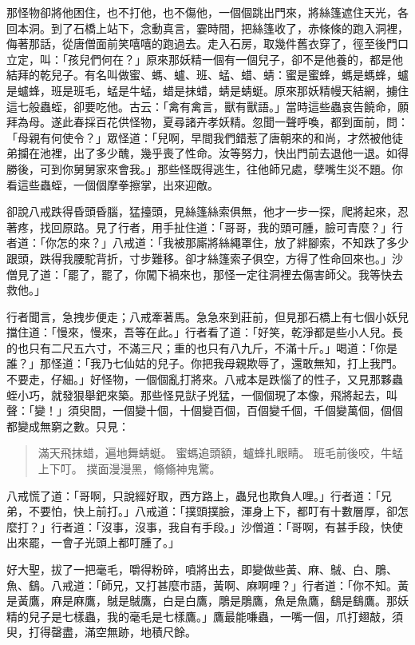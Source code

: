 那怪物卻將他困住，也不打他，也不傷他，一個個跳出門來，將絲篷遮住天光，各回本洞。到了石橋上站下，念動真言，霎時間，把絲篷收了，赤條條的跑入洞裡，侮著那話，從唐僧面前笑嘻嘻的跑過去。走入石房，取幾件舊衣穿了，徑至後門口立定，叫：「孩兒們何在？」原來那妖精一個有一個兒子，卻不是他養的，都是他結拜的乾兒子。有名叫做蜜、螞、蠦、班、蜢、蜡、蜻：蜜是蜜蜂，螞是螞蜂，蠦是蠦蜂，班是班毛，蜢是牛蜢，蜡是抹蜡，蜻是蜻蜓。原來那妖精幔天結網，擄住這七般蟲蛭，卻要吃他。古云：「禽有禽言，獸有獸語。」當時這些蟲哀告饒命，願拜為母。遂此春採百花供怪物，夏尋諸卉孝妖精。忽聞一聲呼喚，都到面前，問：「母親有何使令？」眾怪道：「兒啊，早間我們錯惹了唐朝來的和尚，才然被他徒弟攔在池裡，出了多少醜，幾乎喪了性命。汝等努力，快出門前去退他一退。如得勝後，可到你舅舅家來會我。」那些怪既得逃生，往他師兄處，孽嘴生災不題。你看這些蟲蛭，一個個摩拳擦掌，出來迎敵。

卻說八戒跌得昏頭昏腦，猛擡頭，見絲篷絲索俱無，他才一步一探，爬將起來，忍著疼，找回原路。見了行者，用手扯住道：「哥哥，我的頭可腫，臉可青麼？」行者道：「你怎的來？」八戒道：「我被那廝將絲繩罩住，放了絆腳索，不知跌了多少跟頭，跌得我腰駝背折，寸步難移。卻才絲篷索子俱空，方得了性命回來也。」沙僧見了道：「罷了，罷了，你闖下禍來也，那怪一定往洞裡去傷害師父。我等快去救他。」

行者聞言，急拽步便走；八戒牽著馬。急急來到莊前，但見那石橋上有七個小妖兒擋住道：「慢來，慢來，吾等在此。」行者看了道：「好笑，乾淨都是些小人兒。長的也只有二尺五六寸，不滿三尺；重的也只有八九斤，不滿十斤。」喝道：「你是誰？」那怪道：「我乃七仙姑的兒子。你把我母親欺辱了，還敢無知，打上我門。不要走，仔細。」好怪物，一個個亂打將來。八戒本是跌惱了的性子，又見那夥蟲蛭小巧，就發狠舉鈀來築。那些怪見獃子兇猛，一個個現了本像，飛將起去，叫聲：「變！」須臾間，一個變十個，十個變百個，百個變千個，千個變萬個，個個都變成無窮之數。只見：
\begin{quote}
滿天飛抹蜡，遍地舞蜻蜓。
蜜螞追頭額，蠦蜂扎眼睛。
班毛前後咬，牛蜢上下叮。
撲面漫漫黑，翛翛神鬼驚。
\end{quote}

八戒慌了道：「哥啊，只說經好取，西方路上，蟲兒也欺負人哩。」行者道：「兄弟，不要怕，快上前打。」八戒道：「撲頭撲臉，渾身上下，都叮有十數層厚，卻怎麼打？」行者道：「沒事，沒事，我自有手段。」沙僧道：「哥啊，有甚手段，快使出來罷，一會子光頭上都叮腫了。」

好大聖，拔了一把毫毛，嚼得粉碎，噴將出去，即變做些黃、麻、𪀚、白、鵰、魚、鷂。八戒道：「師兄，又打甚麼市語，黃啊、麻啊哩？」行者道：「你不知。黃是黃鷹，麻是麻鷹，𪀚是𪀚鷹，白是白鷹，鵰是鵰鷹，魚是魚鷹，鷂是鷂鷹。那妖精的兒子是七樣蟲，我的毫毛是七樣鷹。」鷹最能嗛蟲，一嘴一個，爪打翅敲，須臾，打得罄盡，滿空無跡，地積尺餘。

